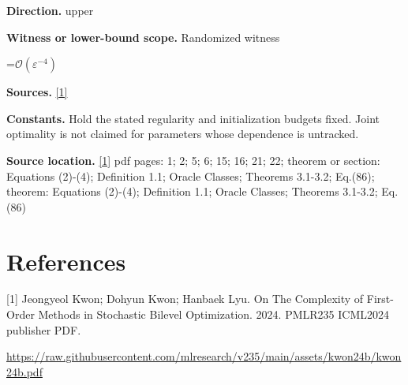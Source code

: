 \documentclass[10pt,a4paper]{article}
\newcommand{\AtlasMath}[1]{\par\begingroup\centering\setbox0=\hbox{$\displaystyle #1$}\ifdim\wd0>1.4\linewidth\typeout{ATLAS WIDE FORMULA: \the\wd0}\fi\ifdim\wd0>\linewidth\resizebox{\linewidth}{!}{\box0}\else\box0\fi\par\endgroup}
\begin{document}
\textbf{Direction.} upper

\textbf{Witness or lower-bound scope.} Randomized witness

\AtlasMath{\mathcal{O}(\varepsilon^{-4})}
\textbf{Sources.} \href{https://raw.githubusercontent.com/mlresearch/v235/main/assets/kwon24b/kwon24b.pdf}{[1]}

\textbf{Constants.} Hold the stated regularity and initialization budgets fixed. Joint optimality is not claimed for parameters whose dependence is untracked.

\textbf{Source location.} \href{https://raw.githubusercontent.com/mlresearch/v235/main/assets/kwon24b/kwon24b.pdf}{[1]} pdf pages: 1; 2; 5; 6; 15; 16; 21; 22; theorem or section: Equations (2)-(4); Definition 1.1; Oracle Classes; Theorems 3.1-3.2; Eq.(86); theorem: Equations (2)-(4); Definition 1.1; Oracle Classes; Theorems 3.1-3.2; Eq.(86)

\section{References}
[1] Jeongyeol Kwon; Dohyun Kwon; Hanbaek Lyu. On The Complexity of First-Order Methods in Stochastic Bilevel Optimization. 2024. PMLR235 ICML2024 publisher PDF.

\url{https://raw.githubusercontent.com/mlresearch/v235/main/assets/kwon24b/kwon24b.pdf}
\end{document}

